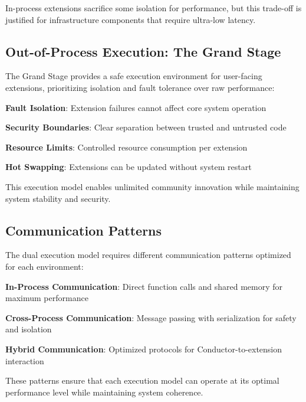 In-process extensions sacrifice some isolation for performance, but this trade-off is justified for infrastructure components that require ultra-low latency.

\subsection*{Out-of-Process Execution: The Grand Stage}

The Grand Stage provides a safe execution environment for user-facing extensions, prioritizing isolation and fault tolerance over raw performance:

\begin{infobox}[title=Out-of-Process Benefits]
\begin{compactlist}
    \item \textbf{Fault Isolation}: Extension failures cannot affect core system operation
    \item \textbf{Security Boundaries}: Clear separation between trusted and untrusted code
    \item \textbf{Resource Limits}: Controlled resource consumption per extension
    \item \textbf{Hot Swapping}: Extensions can be updated without system restart
\end{compactlist}
\end{infobox}

This execution model enables unlimited community innovation while maintaining system stability and security.

\subsection*{Communication Patterns}

The dual execution model requires different communication patterns optimized for each environment:

\begin{compactlist}
    \item \textbf{In-Process Communication}: Direct function calls and shared memory for maximum performance
    \item \textbf{Cross-Process Communication}: Message passing with serialization for safety and isolation
    \item \textbf{Hybrid Communication}: Optimized protocols for Conductor-to-extension interaction
\end{compactlist}

These patterns ensure that each execution model can operate at its optimal performance level while maintaining system coherence.

